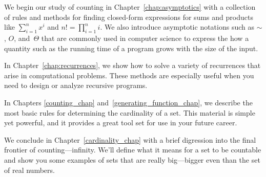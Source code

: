 
We begin our study of counting in Chapter~\ref{chap:asymptotics} with
a collection of rules and methods for finding closed-form expressions
for sums and products like $\sum_{i = 1}^n x^i$ and $n! =
\prod_{i=1}^n i$.  We also introduce asymptotic notations such as
$\sim$, $O$, and~$\Theta$ that are commonly used in computer science
to express the how a quantity such as the running time of a program
grows with the size of the input.

In Chapter~\ref{chap:recurrences}, we show how to solve a variety of
recurrences that arise in computational problems.  These methods are
especially useful when you need to design or analyze recursive
programs.

In Chapters \ref{counting_chap} and~\ref{generating_function_chap}, we
describe the most basic rules for determining the cardinality of a
set.  This material is simple yet powerful, and it provides a great
tool set for use in your future career.

We conclude in Chapter~\ref{cardinality_chap} with a brief digression
into the final frontier of counting---infinity.  We'll define what it
means for a set to be countable and show you some examples of sets
that are really big---bigger even than the set of real numbers.

\endinput
